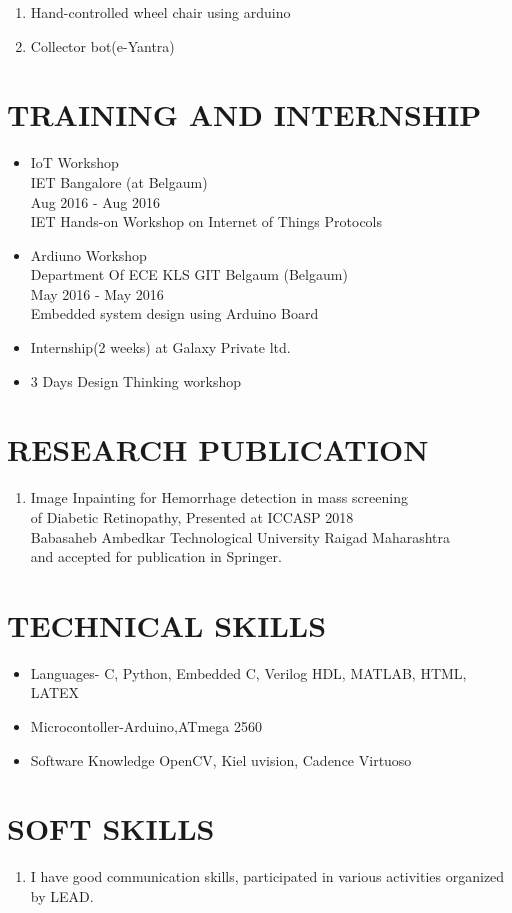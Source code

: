 \documentclass[paper=a4,fontsize=11pt]{scrartcl}
\newcommand{\NewPart}[1]{\section*{\uppercase{#1}}}
\begin{document}
\begin{enumerate}
  \item Hand-controlled wheel chair using arduino
  \item Collector bot(e-Yantra)
\end{enumerate}
\newpage
\NewPart{Training and Internship}
\begin{itemize}
  \item IoT Workshop\\
IET Bangalore (at Belgaum)\\
Aug 2016 - Aug 2016\\
IET Hands-on Workshop on Internet of Things Protocols
  \item Ardiuno Workshop\\
Department Of ECE KLS GIT Belgaum (Belgaum)\\
May 2016 - May 2016\\
Embedded system design using Arduino Board
  \item Internship(2 weeks) at Galaxy Private ltd.
\item 3 Days Design Thinking workshop
\end{itemize}
\NewPart{Research Publication}

\begin{enumerate}
\item
Image Inpainting for Hemorrhage detection in mass screening \\of Diabetic Retinopathy, Presented at ICCASP 2018 \\
 Babasaheb Ambedkar
Technological University Raigad Maharashtra\\ and accepted for publication in Springer.
\end{enumerate}

\NewPart{Technical Skills}{}
\begin{itemize}
\item  Languages- C, Python, Embedded C, Verilog HDL, MATLAB, HTML, LATEX
\item Microcontoller-Arduino,ATmega 2560

\item Software Knowledge OpenCV, Kiel uvision, Cadence Virtuoso
\end{itemize}
\NewPart{Soft skills}
\begin{enumerate}
\item I have good communication skills, participated in various activities organized by LEAD.
\end{enumerate}
\end{document}
